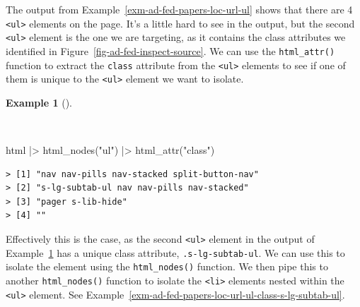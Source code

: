 \documentclass[
  letterpaper,
  DIV=11,
  numbers=noendperiod]{scrreport}
\newenvironment{Shaded}{\begin{snugshade}}{\end{snugshade}}
\newcommand{\FunctionTok}[1]{\textcolor[rgb]{0.00,0.00,0.00}{#1}}
\newcommand{\NormalTok}[1]{\textcolor[rgb]{0.00,0.00,0.00}{#1}}
\newcommand{\SpecialCharTok}[1]{\textcolor[rgb]{0.00,0.00,0.00}{#1}}
\newcommand{\StringTok}[1]{\textcolor[rgb]{0.00,0.00,0.00}{#1}}
\theoremstyle{definition}
\newtheorem{example}{Example}[chapter]
\theoremstyle{remark}
\begin{document}
The output from Example~\ref{exm-ad-fed-papers-loc-url-ul} shows that
there are 4 \texttt{\textless{}ul\textgreater{}} elements on the page.
It's a little hard to see in the output, but the second
\texttt{\textless{}ul\textgreater{}} element is the one we are
targeting, as it contains the class attributes we identified in
Figure~\ref{fig-ad-fed-inspect-source}. We can use the
\texttt{html\_attr()} function to extract the \texttt{class} attribute
from the \texttt{\textless{}ul\textgreater{}} elements to see if one of
them is unique to the \texttt{\textless{}ul\textgreater{}} element we
want to isolate.

\begin{example}[]\protect\hypertarget{exm-ad-fed-papers-loc-url-ul-class}{}\label{exm-ad-fed-papers-loc-url-ul-class}

~

\begin{Shaded}
\begin{Highlighting}[]
\NormalTok{html }\SpecialCharTok{|\textgreater{}} 
  \FunctionTok{html\_nodes}\NormalTok{(}\StringTok{"ul"}\NormalTok{) }\SpecialCharTok{|\textgreater{}} 
  \FunctionTok{html\_attr}\NormalTok{(}\StringTok{"class"}\NormalTok{)}
\end{Highlighting}
\end{Shaded}

\begin{verbatim}
> [1] "nav nav-pills nav-stacked split-button-nav"
> [2] "s-lg-subtab-ul nav nav-pills nav-stacked"  
> [3] "pager s-lib-hide"                          
> [4] ""
\end{verbatim}

\end{example}

Effectively this is the case, as the second
\texttt{\textless{}ul\textgreater{}} element in the output of
Example~\ref{exm-ad-fed-papers-loc-url-ul-class} has a unique class
attribute, \texttt{.s-lg-subtab-ul}. We can use this to isolate the
element using the \texttt{html\_nodes()} function. We then pipe this to
another \texttt{html\_nodes()} function to isolate the
\texttt{\textless{}li\textgreater{}} elements nested within the
\texttt{\textless{}ul\textgreater{}} element. See
Example~\ref{exm-ad-fed-papers-loc-url-ul-class-s-lg-subtab-ul}.
\end{document}

